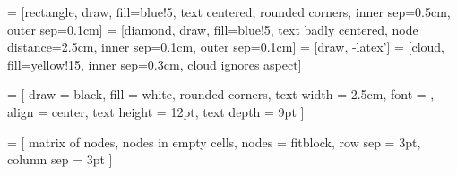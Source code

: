 
\setcounter{secnumdepth}{2}


\newenvironment{ctable}[2] {
\begin{table}[htbp]
  \caption{#1}
  \begin{center}
    \begin{tabular}{#2}
}
{
    \end{tabular}
  \end{center}
\end{table}
}


\usepackage{tikz}
\usepackage{pgfplots}
\usepackage{pgfplotstable}
\usepackage{tikzscale}
\usetikzlibrary{shapes, arrows, calc, positioning, fit, matrix}

 = [rectangle,
    draw,
    fill=blue!5,
    text centered,
    rounded corners,
    inner sep=0.5cm,
    outer sep=0.1cm]
 = [diamond,
    draw,
    fill=blue!5,
    text badly centered,
    node distance=2.5cm,
    inner sep=0.1cm,
    outer sep=0.1cm]
 = [draw, -latex']
 = [cloud,
    fill=yellow!15,
    inner sep=0.3cm,
    cloud ignores aspect]

 = [
    draw = black,
    fill = white,
    rounded corners,
    text width = 2.5cm,
    font = {\sffamily\bfseries\color{black}},
    align = center,
    text height = 12pt,
    text depth = 9pt
]

 = [
    matrix of nodes,
    nodes in empty cells,
    nodes = {fitblock},
    row sep = 3pt,
    column sep = 3pt
]


\newcommand{\spanblock}[3]{
    \node[
        fitblock,
        inner sep = 0pt,
        fit = {(#1) (#2)},
        label = center:{\sffamily\bfseries\color{black}#3}
    ] {};
}

\newcommand{\performanceplot}[2]
{
    \begin{tikzpicture}
        \pgfplotstableread[col sep = semicolon]{#1}\csvdata
        \begin{axis}[#2]
            \addplot table[y=serial/serial]{\csvdata};
            \addlegendentry{s/s}
            \addplot table[y=serial/preemptive]{\csvdata};
            \addlegendentry{s/p}
            \addplot table[y=cooperative/cooperative]{\csvdata};
            \addlegendentry{c/c}
            \addplot table[y=cooperative/preemptive]{\csvdata};
            \addlegendentry{c/p}
        \end{axis}
    \end{tikzpicture}
}

